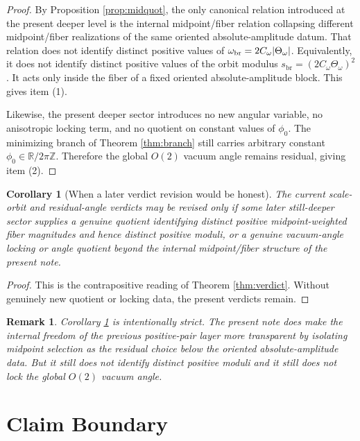 \documentclass[11pt]{article}
\newcommand{\ScaleMod}{s_{\mathrm{br}}}
\newcommand{\AbsScaleAmp}{\omega_{\mathrm{br}}}
\newcommand{\MidScale}{C_{\omega}}
\newcommand{\FiberScale}{\Theta_{\omega}}
\newtheorem{remark}{Remark}
\newtheorem{corollary}{Corollary}
\begin{document}
\begin{proof}
By Proposition \ref{prop:midquot}, the only canonical relation introduced at the present deeper level is the internal midpoint/fiber relation collapsing different midpoint/fiber realizations of the same oriented absolute-amplitude datum. That relation does not identify distinct positive values of \(\AbsScaleAmp=2\MidScale\abs{\FiberScale}\). Equivalently, it does not identify distinct positive values of the orbit modulus \(\ScaleMod=(2\MidScale\FiberScale)^{2}\). It acts only inside the fiber of a fixed oriented absolute-amplitude block. This gives item (1).

Likewise, the present deeper sector introduces no new angular variable, no anisotropic locking term, and no quotient on constant values of \(\phi_{0}\). The minimizing branch of Theorem \ref{thm:branch} still carries arbitrary constant \(\phi_{0}\in\mathbb R/2\pi\mathbb Z\). Therefore the global \(O(2)\) vacuum angle remains residual, giving item (2).
\end{proof}

\begin{corollary}[When a later verdict revision would be honest]
\label{cor:revision}
The current scale-orbit and residual-angle verdicts may be revised only if some later still-deeper sector supplies a genuine quotient identifying distinct positive midpoint-weighted fiber magnitudes and hence distinct positive moduli, or a genuine vacuum-angle locking or angle quotient beyond the internal midpoint/fiber structure of the present note.
\end{corollary}

\begin{proof}
This is the contrapositive reading of Theorem \ref{thm:verdict}. Without genuinely new quotient or locking data, the present verdicts remain.
\end{proof}

\begin{remark}
Corollary \ref{cor:revision} is intentionally strict. The present note does make the internal freedom of the previous positive-pair layer more transparent by isolating midpoint selection as the residual choice below the oriented absolute-amplitude data. But it still does not identify distinct positive moduli and it still does not lock the global \(O(2)\) vacuum angle.
\end{remark}

\section{Claim Boundary}
\end{document}
